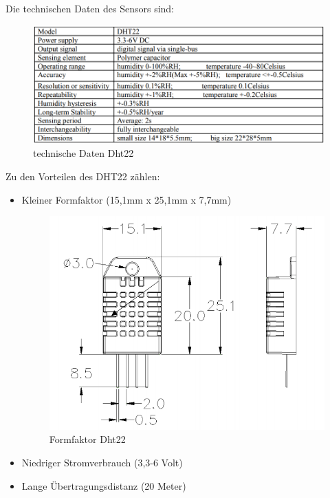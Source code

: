 \pagebreak

Die technischen Daten des Sensors sind:
\begin{figure}[H]
    \begin{center}
        \includegraphics[scale=0.6]{images/dht22_datasheet.png}
        \caption{technische Daten Dht22 \cite{dht22_datasheet_sparkfun}}
    \end{center}
\end{figure}

Zu den Vorteilen des DHT22 zählen:
\begin{itemize}
    \item Kleiner Formfaktor (15,1mm x 25,1mm x 7,7mm)
    \begin{figure}[H]
        \begin{center}
            \includegraphics[scale=0.6]{images/dht22_formfaktor.png}
            \caption{Formfaktor Dht22 \cite{dht22_datasheet_sparkfun}}
        \end{center}
    \end{figure}
    \item Niedriger Stromverbrauch (3,3-6 Volt)
    \item Lange Übertragungsdistanz (20 Meter)
\end{itemize}

